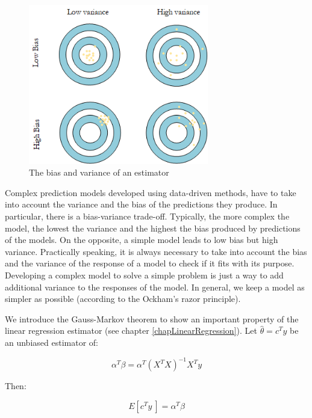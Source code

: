 \begin{figure}[hbt!]
\centering
\includegraphics[width=0.7\textwidth]{SectionLetsMath/elemStat_figures/fig_biasVariance.png}
\captionsetup{type=figure}
\caption{The bias and variance of an estimator}
\label{fig_biasVariance}
\end{figure}

Complex prediction models developed using data-driven methods, have to take into account the variance and the bias of the predictions they produce. In particular, there is a bias-variance trade-off. Typically, the more complex the model, the lowest the variance and the highest the bias produced by predictions of the models. On the opposite, a simple model leads to low bias but high variance. Practically speaking, it is always necessary to take into account the bias and the variance of the response of a model to check if it fits with its purpose. Developing a complex model to solve a simple problem is just a way to add additional variance to the responses of the model. In general, we keep a model as simpler as possible (according to the Ockham's razor principle). \par

We introduce the Gauss-Markov theorem to show an important property of the linear regression estimator (see chapter \ref{chapLinearRegression}). Let $\hat{\theta}=c^Ty$ be an unbiased estimator of:

\begin{equation}
\alpha^T\beta=\alpha^T\left(X^TX\right)^{-1}X^Ty
\label{eq_biasLinearRegression1}
\end{equation}

Then:

\begin{equation}
E\left[c^Ty\ \right]=\alpha^T\beta
\label{eq_biasLinearRegression2}
\end{equation}

